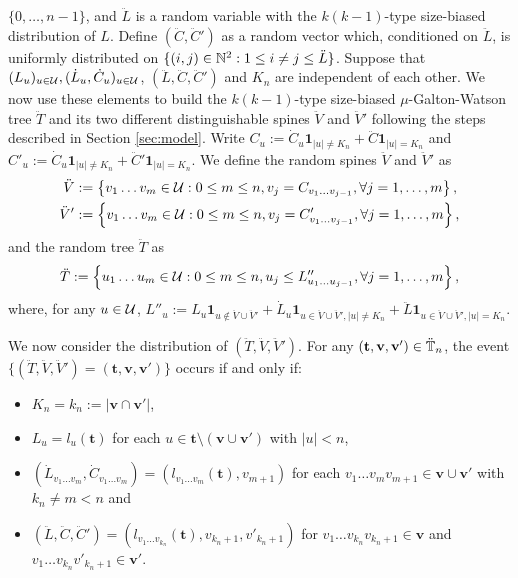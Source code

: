 \documentclass[12pt]{amsart}
\numberwithin{equation}{section}
\newcommand{\ind}[1]{\mathbf 1_{#1}}
\newcommand{\abs}[1]{\left| #1 \right|}
\newcommand{\set}[1]{\left\{ #1 \right\}}
\newcommand{\tree}{\mathbf t}
\newcommand{\spine}{\mathbf v}
\begin{document}
		$\{0,\dots,n-1\}$,
	and $\ddot L$ is a random variable with the $k(k-1)$-type size-biased distribution of $L$.
	Define $(\ddot C,\ddot C')$ as a random vector which, conditioned on $\ddot L$, is uniformly distributed on $\{(i,j)\in\mathbb N^2:1\leq i\neq j\leq \ddot L\}$.
	Suppose that $(L_u)_{u\in\mathcal U}, (\dot L_u,\dot C_u)_{u\in \mathcal U}$, $(\ddot L,\ddot C,\ddot C')$ and $K_n$ are independent of each other.
	We now use these elements to build the $k(k-1)$-type size-biased 
$\mu$-Galton-Watson tree $\ddot T$ and 
	its two different distinguishable spines $\ddot V$ and $\ddot V'$ following the steps described in Section \ref{sec:model}.
	Write $C_u:=\dot C_u\ind{|u|\neq K_n}+\ddot C\ind{|u|=K_n}$ and $C'_u:=\dot C_u\ind{|u|\neq K_n}+\ddot C'\ind{|u|=K_n}$.
	We define the random spines $\ddot V$ and $\ddot V'$ as
\begin{align*}
        \ddot V
	&:=
				\set{v_1\dots v_m\in \cU:0\le m\le n, v_j= C_{v_1\dots v_{j-1}},\forall j=1,\dots,m},
	\\
		\ddot V'
	&:=
				\set{v_1\dots v_m\in \cU:0\le m \le n, v_j= C'_{v_1\dots v_{j-1}},\forall j=1,\dots,m},
\end{align*}
	and the random tree $\ddot T$ as
\begin{equation*}
	    \ddot T
	:=
		\set{u_1\dots u_m\in\cU: 0\le m\le n,u_j\leq L''_{u_1\dots u_{j-1}},\forall j=1,\dots,m},
\end{equation*}
	where, for any $u\in\mathcal U$, $L''_u:=L_u \ind{u\not\in \ddot V\cup\ddot V'}+\dot L_u \ind{u\in \ddot V\cup\ddot V',|u|\neq K_n}+\ddot L\ind{u\in \ddot V\cup\ddot V',|u|=K_n}$.
\par
We now consider the distribution of
	$(\ddot T,\ddot V,\ddot V')$. For any $(\tree,\spine,\spine')\in\ddot\bbT_n$, the event $\{(\ddot T,\ddot V,\ddot V')=(\tree,\spine,\spine')\}$ occurs if and only if:
\begin{itemize}
\item
    $K_n=k_n:=|\spine\cap\spine'|$,
\item
    $L_u=l_u(\tree)$ for each $u\in \tree\setminus(\spine\cup\spine')$ with $\abs{u}<n$,
\item
        $(\dot L_{v_1\dots v_m},\dot C_{v_1\dots v_m})=(l_{v_1\dots v_m}(\tree),v_{m+1})$ for each $v_1\dots v_mv_{m+1}\in\spine\cup\spine'$ with $k_n\neq m<n$ and
\item
        $(\ddot L,\ddot C,\ddot C')=(l_{v_1\dots v_{k_n}}(\tree),v_{k_n+1},v'_{k_n+1})$ for $v_1\dots v_{k_n}v_{k_n+1}\in\spine$ and $v_1\dots v_{k_n}v'_{k_n+1}\in\spine'$.
\end{itemize}
\end{document}
